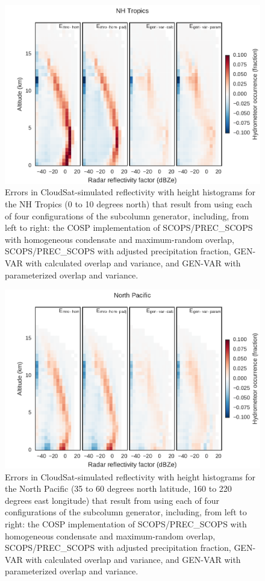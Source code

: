 \begin{figure}[htbp]
\centering
\includegraphics{graphics/subgrid2_cfadDbze94_NHTropics_all_diff.pdf}
\caption{\label{fig:cfadTropicsAllDiff}Errors in CloudSat-simulated
reflectivity with height histograms for the NH Tropics (0 to 10 degrees
north) that result from using each of four configurations of the
subcolumn generator, including, from left to right: the COSP
implementation of SCOPS/PREC\_SCOPS with homogeneous condensate and
maximum-random overlap, SCOPS/PREC\_SCOPS with adjusted precipitation
fraction, GEN-VAR with calculated overlap and variance, and GEN-VAR with
parameterized overlap and variance.}\label{fig:cfadTropicsAllDiff}
\end{figure}

\begin{figure}[htbp]
\centering
\includegraphics{graphics/subgrid2_cfadDbze94_NorthPacific_all_diff.pdf}
\caption{\label{fig:cfadNPAllDiff}Errors in CloudSat-simulated
reflectivity with height histograms for the North Pacific (35 to 60
degrees north latitude, 160 to 220 degrees east longitude) that result
from using each of four configurations of the subcolumn generator,
including, from left to right: the COSP implementation of
SCOPS/PREC\_SCOPS with homogeneous condensate and maximum-random
overlap, SCOPS/PREC\_SCOPS with adjusted precipitation fraction, GEN-VAR
with calculated overlap and variance, and GEN-VAR with parameterized
overlap and variance.}\label{fig:cfadNPAllDiff}
\end{figure}

